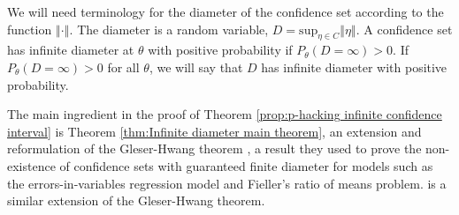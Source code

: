 \documentclass{article}
\theoremstyle{plain}
\theoremstyle{plain}
\theoremstyle{definition}
\theoremstyle{remark}
\theoremstyle{definition}
\theoremstyle{plain}
\theoremstyle{plain}
\theoremstyle{definition}
\begin{document}
We will need terminology for the diameter of the confidence set according
to the function $\left\Vert \cdot\right\Vert $. The diameter is
a random variable, $D=\textrm{sup}_{\eta\in C}\left\Vert \eta\right\Vert $.
A confidence set has infinite diameter at $\theta$ with positive
probability if $P_{\theta}(D=\infty)>0$. If $P_{\theta}(D=\infty)>0$
for all $\theta$, we will say that $D$ has infinite diameter with
positive probability.

The main ingredient in the proof of Theorem \ref{prop:p-hacking infinite confidence interval}
is Theorem \ref{thm:Infinite diameter main theorem}, an extension
and reformulation of the Gleser-Hwang theorem \citep{gleser1987nonexistence},
a result they used to prove the non-existence of confidence sets with
guaranteed finite diameter for models such as the errors-in-variables
regression model and Fieller's ratio of means problem. \citet[theorem 1]{berger1999integrated}
is a similar extension of the Gleser-Hwang theorem.
\end{document}

